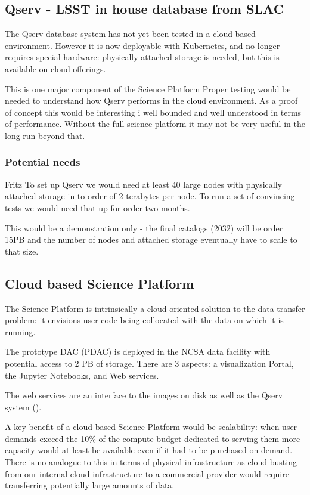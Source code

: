 \subsection{Qserv - LSST in house database from SLAC}\label{sect:qserv}
The Qserv database system  has not yet been tested in a cloud based environment.
However it is now deployable with Kubernetes, and no longer requires special hardware: physically attached storage is needed, but this is available on cloud offerings.

This is one major component of the Science Platform 
Proper testing would be needed to understand how Qserv performs in the cloud environment. As a proof of concept this would be interesting i well bounded and well understood in terms of performance. Without the full science platform it may not be very useful in the long run beyond that.

\subsubsection{Potential needs} \label{sect:qservneeds}
{\color{red} Fritz }
To set up Qserv  we would need at least 40 large nodes with physically attached storage in to order of 2 terabytes per node.
To run a set of convincing tests we would need that up for order two months.

This would be a  demonstration only - the final catalogs (2032) will be order 15PB and the number of nodes and attached storage eventually have to scale to that size.

\subsection{Cloud based Science Platform}
\label{sect:platform}

The Science Platform  is intrinsically a cloud-oriented solution to the data transfer problem: it envisions user code being collocated with the data on which it is running.

The prototype DAC (PDAC) is deployed in the NCSA data facility with potential access to 2 PB of storage. There are 3 aspects: a visualization  Portal, the Jupyter Notebooks, and Web services.

The web services are an interface to the images on disk as well as the Qserv system ().

A key benefit of a cloud-based Science Platform would be scalability: when user demands exceed the 10\% of the compute budget dedicated to serving them more capacity would at least be available even if it had to be purchased on demand.
There is no analogue to this in terms of physical infrastructure as cloud busting from our internal cloud infrastructure to a commercial provider would require transferring potentially large amounts of data.

